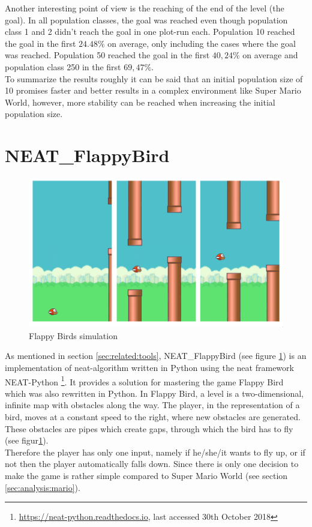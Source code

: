 			Another interesting point of view is the reaching of the end of the level (the goal). In all population classes, the goal was reached even though population class 1 and 2 didn't reach the goal in one plot-run each. Population 10 reached the goal in the first $24.48\%$ on average, only including the cases where the goal was reached. Population 50 reached the goal in the first $40,24\%$ on average and population class 250 in the first $69,47\%$.\\
			To summarize the results roughly it can be said that an initial population size of 10 promises faster and better results in a complex environment like Super Mario World, however, more stability can be reached when increasing the initial population size.
		
		
	
	\newpage %
	
	\section{NEAT\_FlappyBird}
		\label{sec:analysis:flappy}
		
		\begin{figure}[h]
			\centering
			\includegraphics[width=1\textwidth]{graphics/flappy/flappy}
			\caption{Flappy Birds simulation}
			\label{fig:flappy}
		\end{figure}
	
		As mentioned in section \ref{sec:related:tools}, NEAT\_FlappyBird (see figure \ref{fig:flappy}) is an implementation of \gls{neat}-algorithm written in Python using the \gls{neat} framework NEAT-Python \footnote{\url{https://neat-python.readthedocs.io}, last accessed 30th October 2018}. It provides a solution for mastering the game Flappy Bird which was also rewritten in Python. In Flappy Bird, a level is a two-dimensional, infinite map with obstacles along the way. The player, in the representation of a bird, moves at a constant speed to the right, where new obstacles are generated. These obstacles are pipes which create gaps, through which the bird has to fly (see figur\ref{fig:flappy}). \\
		Therefore the player has only one input, namely if he/she/it wants to fly up, or if not then the player automatically falls down. Since there is only one decision to make the game is rather simple compared to Super Mario World (see section \ref{sec:analysis:mario}).
		

